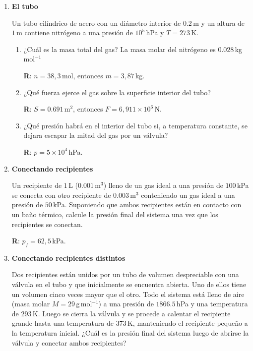 \documentclass[a4paper,12pt]{article}
\begin{document}
\begin{enumerate}
\begin{enumerate}
				{\bf R}: $p=1690,4$\,hPa.
		\end{enumerate}
	
	\item {\bf{El tubo}}
		
		Un tubo cilíndrico de acero con un diámetro interior de $0.2$\,m y un
		altura de $1$\,m contiene nitrógeno a una presión de $10^5$\,hPa y
		$T=273$\,K.

		\begin{enumerate}
			\item ¿Cuál es la masa total del gas? La masa molar del nitrógeno
				es $0.028$\,kg\,mol$^{-1}$
				
				{\bf R}: $n=38,3$\,mol, entonces $m=3,87$\,kg.
			\item ¿Qué fuerza ejerce el gas sobre la superficie interior del tubo?
				
				{\bf R}: $S=0.691$\,m$^2$, entonces $F=6,911 \times 10^6$\,N.
			\item ¿Qué presión habrá en el interior del tubo si, a temperatura
				constante, se dejara escapar la mitad del gas por un válvula?
				
				{\bf R}: $p=5 \times 10^4$\,hPa.
		\end{enumerate}
 
	\item {\bf{Conectando recipientes}}

		Un recipiente de $1$\,L ($0.001$\,m$^3$) lleno de un gas ideal a una
		presión de $100$\,kPa se conecta con otro recipiente de $0.003$\,m$^3$
		conteniendo un gas ideal a una presión de $50$\,kPa. Suponiendo que
		ambos recipientes están en contacto con un baño térmico, calcule la
		presión final del sistema una vez que los recipientes se conectan.

		{\bf R}: $p_f = 62,5$\,kPa.
	\item {\bf{Conectando recipientes distintos}}
	
		Dos recipientes están unidos por un tubo de volumen despreciable con
		una válvula en el tubo y que inicialmente se encuentra abierta. Uno de
		ellos tiene un volumen cinco veces mayor que el otro. Todo el sistema
		está lleno de aire (masa molar $M=29$\,g\,mol$^{-1}$) a una presión de
		$1866.5$\,hPa y una temperatura de $293$\,K. Luego se cierra la válvula
		y se procede a calentar el recipiente grande hasta una temperatura de
		$373$\,K, manteniendo el recipiente pequeño a la temperatura inicial.
		¿Cuál es la presión final del sistema luego de abrirse la válvula y
		conectar ambos recipientes? 
	

\end{enumerate}
\end{document}
